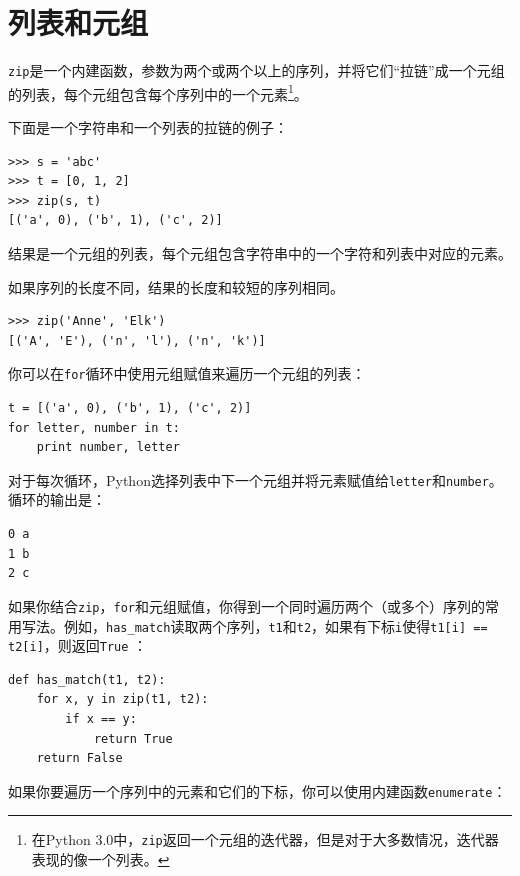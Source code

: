 \section{列表和元组}


{\tt zip}是一个内建函数，参数为两个或两个以上的序列，并将它们“拉链”成一个元组的列表，每个元组包含每个序列中的一个元素\footnote{在Python 3.0中，{\tt zip}返回一个元组的迭代器，但是对于大多数情况，迭代器表现的像一个列表。}。


下面是一个字符串和一个列表的拉链的例子：

\beforeverb
\begin{verbatim}
>>> s = 'abc'
>>> t = [0, 1, 2]
>>> zip(s, t)
[('a', 0), ('b', 1), ('c', 2)]
\end{verbatim}
\afterverb
%
结果是一个元组的列表，每个元组包含字符串中的一个字符和列表中对应的元素。


如果序列的长度不同，结果的长度和较短的序列相同。

\beforeverb
\begin{verbatim}
>>> zip('Anne', 'Elk')
[('A', 'E'), ('n', 'l'), ('n', 'k')]
\end{verbatim}
\afterverb
%
你可以在{\tt for}循环中使用元组赋值来遍历一个元组的列表：


\beforeverb
\begin{verbatim}
t = [('a', 0), ('b', 1), ('c', 2)]
for letter, number in t:
    print number, letter
\end{verbatim}
\afterverb
%
对于每次循环，Python选择列表中下一个元组并将元素赋值给{\tt letter}和{\tt number}。循环的输出是：


\beforeverb
\begin{verbatim}
0 a
1 b
2 c
\end{verbatim}
\afterverb
%
如果你结合{\tt zip}，{\tt for}和元组赋值，你得到一个同时遍历两个（或多个）序列的常用写法。例如，\verb"has_match"读取两个序列，{\tt t1}和{\tt t2}，如果有下标{\tt i}使得{\tt t1[i] == t2[i]}，则返回{\tt True} ：


\beforeverb
\begin{verbatim}
def has_match(t1, t2):
    for x, y in zip(t1, t2):
        if x == y:
            return True
    return False
\end{verbatim}
\afterverb
%
如果你要遍历一个序列中的元素和它们的下标，你可以使用内建函数{\tt enumerate}：

